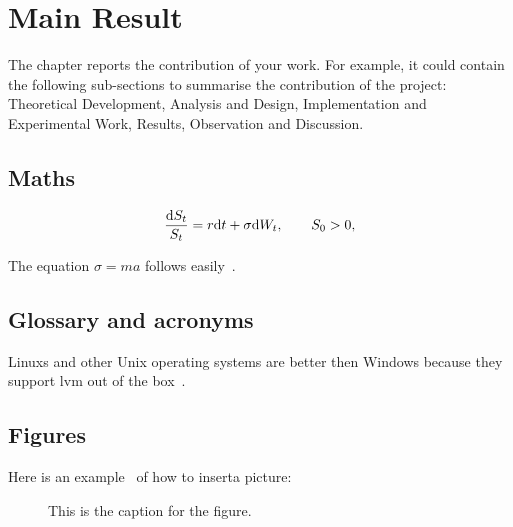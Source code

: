 \section{Main Result}
The chapter reports the contribution of your work.  For example, it could contain the following sub-sections to summarise the contribution of the project: Theoretical Development, Analysis and Design, Implementation and Experimental Work, Results, Observation and Discussion.

\subsection{Maths}
\begin{equation}\label{eq:BS}
\frac{\mathrm{d} S_t}{S_t} = r \mathrm{d} t + \sigma \mathrm{d} W_t,
\qquad S_0>0,
\end{equation}

The equation $\sigma = m a$ follows easily~\cite{Doe11}.


\subsection{Glossary and acronyms}

\Glspl{Linux} and other Unix operating systems are better then Windows because they support \gls{lvm} out of the box~\cite{Joh11}. 

\subsection{Figures}
Here is an example~\cite{JohSil05} of how to inserta picture:

\begin{figure}[!ht]
\centering
{}
\caption{This is the caption for the figure.}
\label{fig:Pict}
\end{figure}

